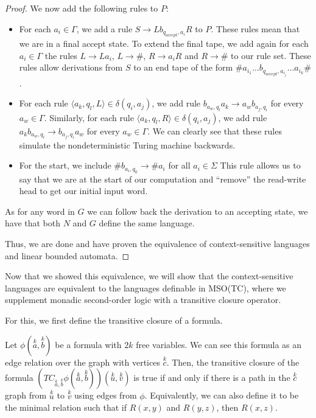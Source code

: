 \begin{proof}
    We now add the following rules to $P$:
    \begin{itemize}
        \setlength\itemsep{0.2em}
        \item For each $a_i \in \Gamma$, we add a rule $S \to Lb_{q_{accept}, a_i}R$ to $P$.
        These rules mean that we are in a final accept state.
        To extend the final tape, we add again for each $a_i \in \Gamma$ the rules $L \to La_i$, $L \to \#$, $R \to a_{i}R$ and $R \to \#$ to our rule set.
        These rules allow derivations from $S$ to an end tape of the form $\#a_{i_1}\dots b_{q_{accept}, a_{i_j}}\dots a_{i_k}\#$.
        \item For each rule $\langle a_k, q_l, L \rangle \in \delta(q_i, a_j)$, we add rule $b_{a_w, q_l}a_k \to a_{w}b_{a_j, q_i}$ for every $a_w \in \Gamma$.
        Similarly, for each rule $\langle a_k, q_l, R \rangle \in \delta(q_i, a_j)$, we add rule $a_{k}b_{a_w, q_l} \to b_{a_j, q_i}a_{w}$ for every $a_w \in \Gamma$.
        We can clearly see that these rules simulate the nondeterministic Turing machine backwards.
        \item For the start, we include $\#b_{a_i, q_0} \to \#a_i$ for all $a_i \in \Sigma$
        This rule allows us to say that we are at the start of our computation and ``remove'' the read-write head to get our initial input word.
    \end{itemize}
    As for any word in $G$ we can follow back the derivation to an accepting state, we have that both $N$ and $G$ define the same language.

    Thus, we are done and have proven the equivalence of context-sensitive languages and linear bounded automata.
\end{proof}

Now that we showed this equivalence, we will show that the context-sensitive languages are equivalent to the languages definable in MSO(TC), where we supplement monadic second-order logic with a transitive closure operator.

For this, we first define the transitive closure of a formula.

\begin{define}
    Let $\phi\left(\overset{k}{a}, \overset{k}{b}\right)$ be a formula with $2k$ free variables.
    We can see this formula as an edge relation over the graph with vertices $\overset{k}{c}$.
    Then, the transitive closure of the formula $\left(TC_{\overset{k}{a}, \overset{k}{b}}\phi\left(\overset{k}{a}, \overset{k}{b}\right)\right)\left(\overset{k}{u}, \overset{k}{v}\right)$ is true if and only if there is a path in the $\overset{k}{c}$ graph from $\overset{k}{u}$ to $\overset{k}{v}$ using edges from $\phi$.
    Equivalently, we can also define it to be the minimal relation such that if $R(x, y)$ and $R(y, z)$, then $R(x, z)$.
\end{define}

